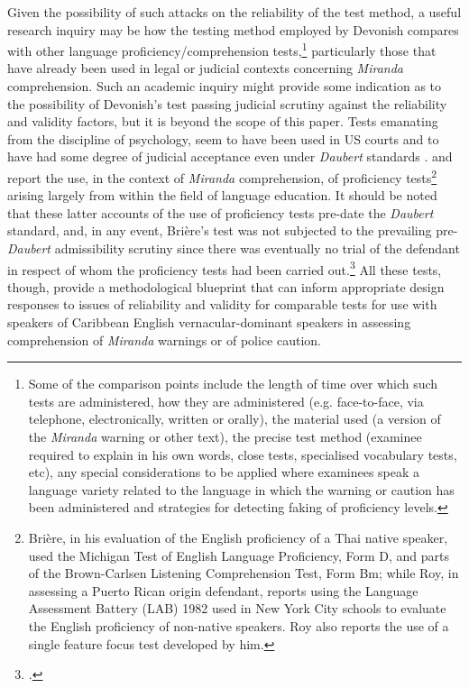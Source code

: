 \documentclass[output=paper,colorlinks,citecolor=brown]{langscibook}
\begin{document}
Given the possibility of such attacks on the reliability of the test method, a useful research inquiry may be how the testing method employed by Devonish compares with other language proficiency/comprehension tests,\footnote{Some of the comparison points include the length of time over which such tests are administered, how they are administered (e.g. face-to-face, via telephone, electronically, written or orally), the material used (a version of the \emph{Miranda} warning or other text), the precise test method (examinee required to explain in his own words, close tests, specialised vocabulary tests, etc), any special considerations to be applied where examinees speak a language variety related to the language in which the warning or caution has been administered and strategies for detecting faking of proficiency levels.}  particularly those that have already been used in legal or judicial contexts concerning \emph{Miranda} comprehension. Such an academic inquiry might provide some indication as to the possibility of Devonish’s test passing judicial scrutiny against the reliability and validity factors, but it is beyond the scope of this paper. Tests emanating from the discipline of psychology, seem to have been used in US courts and to have had some degree of judicial acceptance even under \emph{Daubert} standards \citep{Ryba2007}. \citet{Brière1978} and \citet{Roy1990} report the use, in the context of \emph{Miranda} comprehension, of proficiency tests\footnote{Brière, in his evaluation of the English proficiency of a Thai native speaker, used the Michigan Test of English Language Proficiency, Form D, and parts of the Brown-Carlsen Listening Comprehension Test, Form Bm; while Roy, in assessing a Puerto Rican origin defendant, reports using the Language Assessment Battery (LAB) 1982 used in New York City schools to evaluate the English proficiency of non-native speakers. Roy also reports the use of a single feature focus test developed by him.} arising largely from within the field of language education. It should be noted that these latter accounts of the use of proficiency tests pre-date the \textit{Daubert} standard, and, in any event, Brière’s test was not subjected to the prevailing pre-\emph{Daubert} admissibility scrutiny since there was eventually no trial of the defendant in respect of whom the proficiency tests had been carried out.\footnote{\citet[243, note]{Briere1978}.} All these tests, though, provide a methodological blueprint that can inform appropriate design responses to issues of reliability and validity for comparable tests for use with speakers of Caribbean English vernacular-dominant speakers in assessing comprehension of \emph{Miranda} warnings or of police caution.
\end{document}
